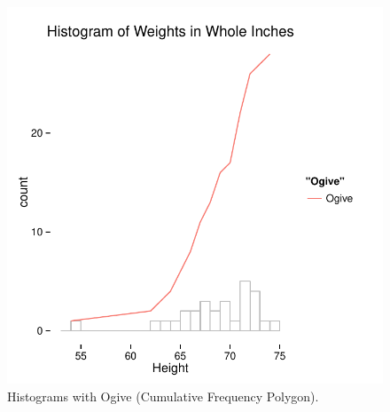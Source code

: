 \documentclass[nohyper,justified]{tufte-handout}\usepackage[]{graphicx}\usepackage[]{color}
\newenvironment{knitrout}{}{} %
\begin{document}
\begin{knitrout}
\color{fgcolor}\begin{figure}

{\centering \includegraphics[width=.49\linewidth]{figure/graphics-ogive-1} 

}

\caption[Histograms with Ogive (Cumulative Frequency Polygon)]{Histograms with Ogive (Cumulative Frequency Polygon).}\label{fig:ogive}
\end{figure}


\end{knitrout}
\end{document}
